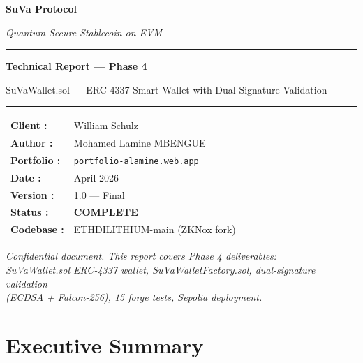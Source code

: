 \documentclass[11pt,a4paper]{article}
\begin{document}

\begin{titlepage}
\centering
\vspace*{2cm}
{\Huge\bfseries\textcolor{suva-blue}{SuVa Protocol}\par}
\vspace{0.5cm}
{\Large\textit{Quantum-Secure Stablecoin on EVM}\par}
\vspace{1.5cm}
\rule{\linewidth}{0.5pt}
\vspace{0.5cm}
{\LARGE\bfseries Technical Report --- Phase 4\par}
\vspace{0.3cm}
{\large SuVaWallet.sol --- ERC-4337 Smart Wallet with Dual-Signature Validation\par}
\vspace{0.5cm}
\rule{\linewidth}{0.5pt}
\vspace{2cm}

\begin{tabular}{ll}
\textbf{Client :}    & William Schulz \\[4pt]
\textbf{Author :}    & Mohamed Lamine MBENGUE \\[4pt]
\textbf{Portfolio :} & \href{https://portfolio-alamine.web.app}{\texttt{portfolio-alamine.web.app}} \\[4pt]
\textbf{Date :}      & April 2026 \\[4pt]
\textbf{Version :}   & 1.0 --- Final \\[4pt]
\textbf{Status :}    & \textcolor{pass-green}{\textbf{COMPLETE}} \\[4pt]
\textbf{Codebase :}  & ETHDILITHIUM-main (ZKNox fork) \\
\end{tabular}

\vfill
\begin{tcolorbox}[enhanced,colback=suva-blue!8,colframe=suva-blue,arc=4mm]
\centering\textit{Confidential document. This report covers Phase 4 deliverables:\\
SuVaWallet.sol ERC-4337 wallet, SuVaWalletFactory.sol, dual-signature validation\\
(ECDSA + Falcon-256), 15 forge tests, Sepolia deployment.}
\end{tcolorbox}
\end{titlepage}

\tableofcontents
\newpage

\section{Executive Summary}
\end{document}
